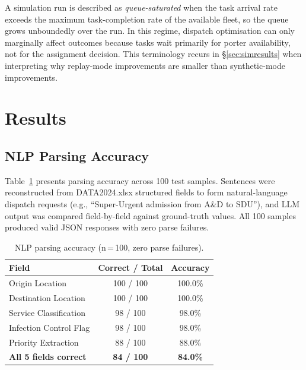 \documentclass[12pt,a4paper]{article}
\begin{document}
A simulation run is described as \emph{queue-saturated} when the task arrival rate exceeds the maximum task-completion rate of the available fleet, so the queue grows unboundedly over the run. In this regime, dispatch optimisation can only marginally affect outcomes because tasks wait primarily for porter availability, not for the assignment decision. This terminology recurs in \S\ref{sec:simresults} when interpreting why replay-mode improvements are smaller than synthetic-mode improvements.

\section{Results}

\subsection{NLP Parsing Accuracy}

Table~\ref{tab:nlp_accuracy} presents parsing accuracy across 100 test samples. Sentences were reconstructed from DATA2024.xlsx structured fields to form natural-language dispatch requests (e.g., ``Super-Urgent admission from A\&D to SDU''), and LLM output was compared field-by-field against ground-truth values. All 100 samples produced valid JSON responses with zero parse failures.

\begin{table}[H]
\centering
\caption{NLP parsing accuracy (n\,=\,100, zero parse failures).}
\label{tab:nlp_accuracy}
\begin{tabular}{lcc}
\toprule
\textbf{Field} & \textbf{Correct / Total} & \textbf{Accuracy} \\
\midrule
Origin Location        & 100 / 100 & 100.0\% \\
Destination Location   & 100 / 100 & 100.0\% \\
Service Classification & 98 / 100  & 98.0\%  \\
Infection Control Flag & 98 / 100  & 98.0\%  \\
Priority Extraction    & 88 / 100  & 88.0\%  \\
\midrule
\textbf{All 5 fields correct} & \textbf{84 / 100} & \textbf{84.0\%} \\
\bottomrule
\end{tabular}
\end{table}
\end{document}
